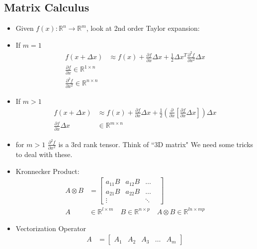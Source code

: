 \documentclass[11pt]{article}
\begin{document}
\subsection{Matrix Calculus}
\begin{itemize}
    \item Given $f(x): \mathbb{R}^n\rightarrow\mathbb{R}^m$, look at 2nd order Taylor expansion:
    \item If $m=1$
    \begin{align*}
        f(x+\Delta x) &\approx f(x) + \frac{\partial f}{\partial x}\Delta x + \frac{1}{2}\Delta x^T\frac{\partial^2 f}{\partial x^2}\Delta x
        \\
        \frac{\partial f}{\partial x} \in \mathbb{R}^{1\times n}
        \\
        \frac{\partial^2 f}{\partial x^2} \in \mathbb{R}^{n\times n}
    \end{align*}
    \item If $m>1$
    \begin{align*}
        f(x+\Delta x) &\approx f(x) + \frac{\partial f}{\partial x}\Delta x + \frac{1}{2}\left( \frac{\partial }{\partial x}\left[  \frac{\partial f}{\partial x}\Delta x\right] \right)\Delta x
        \\
        \frac{\partial f}{\partial x}\Delta x &\in \mathbb{R}^{m\times n}
    \end{align*}
    \item for $m>1$ $\frac{\partial^2 f}{\partial x^2}$ is a 3rd rank tensor. Think of ``3D matrix" We need some tricks to deal with these.
    \item Kronnecker Product:
    \begin{align*}
        A \otimes B &=
        \begin{bmatrix}
            a_{11}B & a_{12}B & \dots & \\
            a_{21}B & a_{22}B & \dots & \\
            \vdots & & \ddots
        \end{bmatrix}
        \\
        A &\in \mathbb{R}^{l\times m} \quad B\in\mathbb{R}^{n\times p} \quad A\otimes B\in\mathbb{R}^{ln\times mp}
    \end{align*}
    \item Vectorization Operator
    \begin{align*}
        A &= \begin{bmatrix}
            A_1 & A_2 & A_3 & \dots & A_m
        \end{bmatrix}

\end{align*}
\end{itemize}
\end{document}
